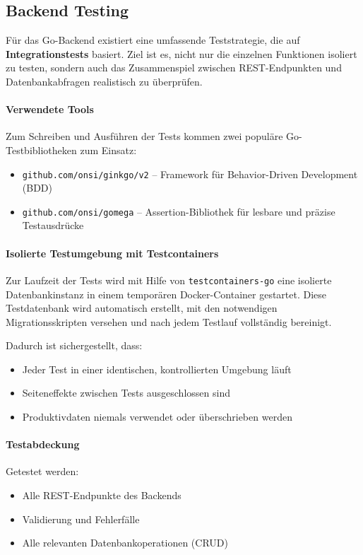 \documentclass[11pt,a4paper]{article}
\begin{document}
\subsection*{Backend Testing}

Für das Go-Backend existiert eine umfassende Teststrategie, die auf \textbf{Integrationstests} basiert. Ziel ist es, nicht nur die einzelnen Funktionen isoliert zu testen, sondern auch das Zusammenspiel zwischen REST-Endpunkten und Datenbankabfragen realistisch zu überprüfen.

\paragraph{Verwendete Tools}
Zum Schreiben und Ausführen der Tests kommen zwei populäre Go-Testbibliotheken zum Einsatz:
\begin{itemize}
    \item \texttt{github.com/onsi/ginkgo/v2} – Framework für Behavior-Driven Development (BDD)
    \item \texttt{github.com/onsi/gomega} – Assertion-Bibliothek für lesbare und präzise Testausdrücke
\end{itemize}

\paragraph{Isolierte Testumgebung mit Testcontainers}
Zur Laufzeit der Tests wird mit Hilfe von \texttt{testcontainers-go} eine isolierte Datenbankinstanz in einem temporären Docker-Container gestartet. Diese Testdatenbank wird automatisch erstellt, mit den notwendigen Migrationsskripten versehen und nach jedem Testlauf vollständig bereinigt.

Dadurch ist sichergestellt, dass:
\begin{itemize}
    \item Jeder Test in einer identischen, kontrollierten Umgebung läuft
    \item Seiteneffekte zwischen Tests ausgeschlossen sind
    \item Produktivdaten niemals verwendet oder überschrieben werden
\end{itemize}

\paragraph{Testabdeckung}
Getestet werden:
\begin{itemize}
    \item Alle REST-Endpunkte des Backends
    \item Validierung und Fehlerfälle
    \item Alle relevanten Datenbankoperationen (CRUD)
\end{itemize}
\end{document}
